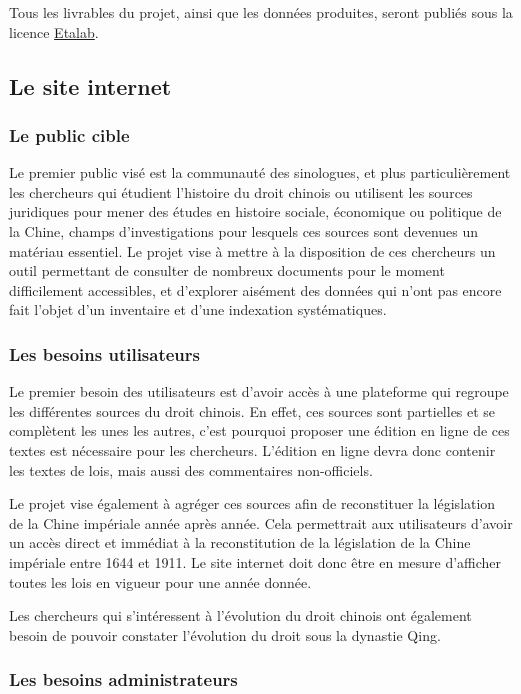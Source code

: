 Tous les livrables du projet, ainsi que les données produites, seront publiés sous la licence \href{https://www.etalab.gouv.fr/licence-ouverte-open-licence/}{Etalab}.

\subsection*{Le site internet}
\subsubsection{Le public cible}
Le premier public visé est la communauté des sinologues, et plus particulièrement les chercheurs qui étudient l’histoire du droit chinois ou utilisent les sources juridiques pour mener des études en histoire sociale, économique ou politique de la Chine, champs d’investigations pour lesquels ces sources sont devenues un matériau essentiel. Le projet vise à mettre à la disposition de ces chercheurs un outil permettant de consulter de nombreux documents pour le moment difficilement accessibles, et d’explorer aisément des données qui n’ont pas encore fait l’objet d’un inventaire et d’une indexation systématiques. 

\subsubsection{Les besoins utilisateurs}
Le premier besoin des utilisateurs est d’avoir accès à une plateforme qui regroupe les différentes sources du droit chinois. En effet, ces sources sont partielles et se complètent les unes les autres, c’est pourquoi proposer une édition en ligne de ces textes est nécessaire pour les chercheurs. L’édition en ligne devra donc contenir les textes de lois, mais aussi des commentaires non-officiels. 

Le projet vise également à agréger ces sources afin de reconstituer la législation de la Chine impériale année après année. Cela permettrait aux utilisateurs d’avoir un accès direct et immédiat à la reconstitution de la législation de la Chine impériale entre 1644 et 1911. Le site internet doit donc être en mesure d’afficher toutes les lois en vigueur pour une année donnée. 

Les chercheurs qui s'intéressent à l’évolution du droit chinois ont également besoin de pouvoir constater l’évolution du droit sous la dynastie Qing. 

\subsubsection{Les besoins administrateurs}

